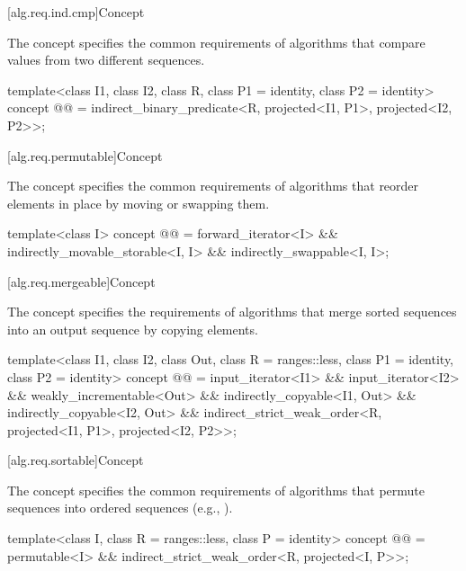 [alg.req.ind.cmp]{Concept }

\pnum
The  concept specifies
the common requirements of algorithms that
compare values from two different sequences.

\begin{codeblock}
template<class I1, class I2, class R, class P1 = identity,
         class P2 = identity>
  concept @@ =
    indirect_binary_predicate<R, projected<I1, P1>, projected<I2, P2>>;
\end{codeblock}

[alg.req.permutable]{Concept }

\pnum
The  concept specifies the common requirements
of algorithms that reorder elements in place by moving or swapping them.

\begin{codeblock}
template<class I>
  concept @@ =
    forward_iterator<I> &&
    indirectly_movable_storable<I, I> &&
    indirectly_swappable<I, I>;
\end{codeblock}

[alg.req.mergeable]{Concept }

\pnum
The  concept specifies the requirements of algorithms
that merge sorted sequences into an output sequence by copying elements.

\begin{codeblock}
template<class I1, class I2, class Out, class R = ranges::less,
         class P1 = identity, class P2 = identity>
  concept @@ =
    input_iterator<I1> &&
    input_iterator<I2> &&
    weakly_incrementable<Out> &&
    indirectly_copyable<I1, Out> &&
    indirectly_copyable<I2, Out> &&
    indirect_strict_weak_order<R, projected<I1, P1>, projected<I2, P2>>;
\end{codeblock}

[alg.req.sortable]{Concept }

\pnum
The  concept specifies the common requirements of
algorithms that permute sequences into ordered sequences (e.g., ).

\begin{codeblock}
template<class I, class R = ranges::less, class P = identity>
  concept @@ =
    permutable<I> &&
    indirect_strict_weak_order<R, projected<I, P>>;
\end{codeblock}

